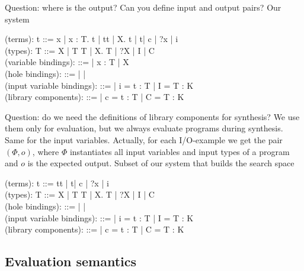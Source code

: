 Question: where is the output? Can you define input and output pairs?
Our system
 \begin{plstx}
(terms): t ::= x | \lambda x : T. t | t\;t | \Lambda X. t | t\;[T] | c | {?x} | i\\
(types): T ::= X | T \rightarrow T | \forall X. T | ?X | I | C\;[T,\ldots, T]\\
(variable bindings): \Gamma ::= \emptyset | \Gamma \cup x : T | \Gamma \cup X\\
(hole bindings): \Xi ::= \emptyset | \Xi {} | \Xi {}\\
(input variable bindings): \Phi ::= \emptyset | \Phi \cup i = t : T | \Phi \cup I = T : K\\
(library components): \Delta ::= \emptyset | \Delta \cup c = t : T | \Delta \cup C = T : K\\
\end{plstx}

Question: do we need the definitions of library components for synthesis? We use them only for evaluation, but we always evaluate programs during synthesis. Same for the input variables. Actually, for each I/O-example we get the pair $(\Phi,o)$, where $\Phi$ instantiates all input variables and input types of a program and $o$ is the expected output.
Subset of our system that builds the search space
 \begin{plstx}
(terms): t ::= t\;t | t\;[T] | c | ?x | i\\
(types): T ::= X | T \rightarrow T | \forall X. T | ?X | I | C\;[T,\ldots, T]\\
(hole bindings): \Xi ::= \emptyset | \Xi {} | \Xi {}\\
(input variable bindings): \Phi ::= \emptyset | \Phi \cup i = t : T | \Phi \cup I = T : K\\
(library components): \Delta ::= \emptyset | \Delta \cup c = t : T | \Delta \cup C = T : K\\
\end{plstx}
 
 
  \subsection{Evaluation semantics}


  
  

